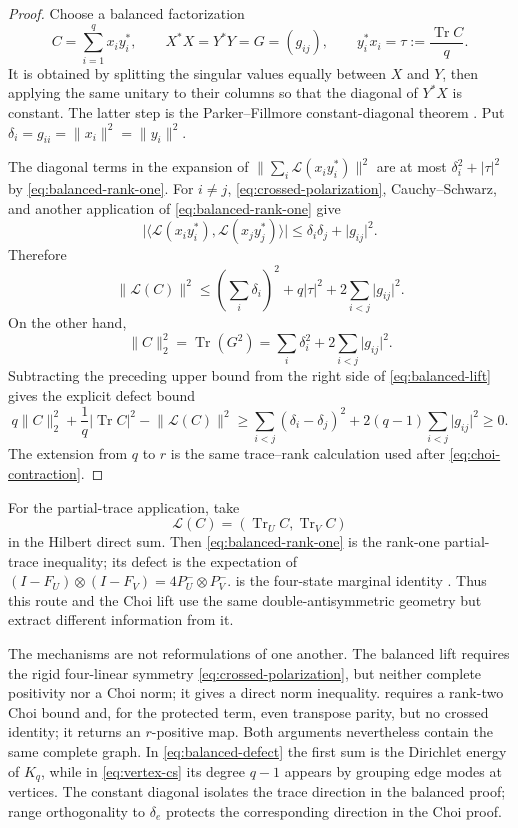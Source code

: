 \documentclass[11pt,reqno]{amsart}
\theoremstyle{remark}
\DeclareMathOperator{\Tr}{Tr}
\newcommand{\ip}[2]{\langle #1,#2\rangle}
\newcommand{\norm}[1]{\lVert #1\rVert}
\newcommand{\abs}[1]{\lvert #1\rvert}
\begin{document}
\begin{proof}
Choose a balanced factorization
\[
  C=\sum_{i=1}^q x_i y_i^*,\qquad
  X^*X=Y^*Y=G=(g_{ij}),\qquad
  y_i^*x_i=\tau:=\frac{\Tr C}{q}.
\]
It is obtained by splitting the singular values equally between $X$ and $Y$,
then applying the same unitary to their columns so that the diagonal of
$Y^*X$ is constant.  The latter step is the Parker--Fillmore
constant-diagonal theorem \cite{Fillmore1969,Parker1948}.  Put
$\delta_i=g_{ii}=\norm{x_i}^2=\norm{y_i}^2$.

The diagonal terms in the expansion of
$\norm{\sum_i\mathcal L(x_i y_i^*)}^2$ are at most
$\delta_i^2+\abs\tau^2$ by \cref{eq:balanced-rank-one}.  For $i\ne j$,
\cref{eq:crossed-polarization}, Cauchy--Schwarz, and another application of
\cref{eq:balanced-rank-one} give
\[
  \abs{\ip{\mathcal L(x_i y_i^*)}{\mathcal L(x_j y_j^*)}}
  \le \delta_i\delta_j+\abs{g_{ij}}^2.
\]
Therefore
\[
  \norm{\mathcal L(C)}^2
  \le\left(\sum_i\delta_i\right)^2
      +q\abs\tau^2+2\sum_{i<j}\abs{g_{ij}}^2.
\]
On the other hand,
\[
  \norm C_2^2=\Tr(G^2)
  =\sum_i\delta_i^2+2\sum_{i<j}\abs{g_{ij}}^2.
\]
Subtracting the preceding upper bound from the right side of
\cref{eq:balanced-lift} gives the explicit defect bound
\begin{equation}
\label{eq:balanced-defect}
  q\norm C_2^2+\frac1q\abs{\Tr C}^2-\norm{\mathcal L(C)}^2
  \ge \sum_{i<j}(\delta_i-\delta_j)^2
      +2(q-1)\sum_{i<j}\abs{g_{ij}}^2
  \ge0.
\end{equation}
The extension from $q$ to $r$ is the same trace--rank calculation used after
\cref{eq:choi-contraction}.
\end{proof}

For the partial-trace application, take
\[
  \mathcal L(C)=(\Tr_U C,\Tr_V C)
\]
in the Hilbert direct sum.  Then \cref{eq:balanced-rank-one} is the rank-one
partial-trace inequality; its defect is the expectation of
$(I-F_U)\otimes(I-F_V)=4P_U^-\otimes P_V^-$.  
is the four-state marginal identity
\cite[\S8]{FraserHuberPozsgayVona2026}.  Thus this
route and the Choi lift use the same double-antisymmetric geometry but extract
different information from it.

The mechanisms are not reformulations of one another.  The balanced lift
requires the rigid four-linear symmetry
\cref{eq:crossed-polarization}, but neither complete positivity nor a Choi
norm; it gives a direct norm inequality.   requires a
rank-two Choi bound and, for the protected term, even transpose parity, but no
crossed identity; it returns an $r$-positive map.  Both arguments nevertheless
contain the same complete graph.  In \cref{eq:balanced-defect} the first sum is
the Dirichlet energy of $K_q$, while in \cref{eq:vertex-cs} its degree
$q-1$ appears by grouping edge modes at vertices.  The constant diagonal
isolates the trace direction in the balanced proof; range orthogonality to
$\delta_e$ protects the corresponding direction in the Choi proof.
\end{document}
